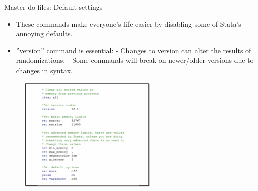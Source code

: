 \documentclass[aspectratio=169]{beamer}
\begin{document}
\begin{frame}[fragile]{Master do-files: Default settings}
\begin{multicols}{2}	
	
	\begin{itemize}[<default overlay specification>]
		\item<1> These commands make everyone’s life easier by disabling some of Stata’s annoying defaults.
		\item<1> ”version” command is essential:
			\newline - Changes to version can alter the results of randomizations.
			\newline - Some commands will break on newer/older versions due to changes in syntax.
	\end{itemize}
	
	\begin{figure}
		\centering
		\includegraphics[height=55mm]{img/Structure14}
	\end{figure}
	
\end{multicols}
\end{frame}
\end{document}

